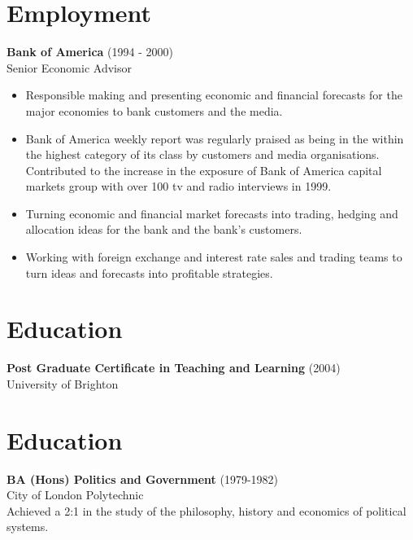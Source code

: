 \documentclass[margin,11pt]{res} %
\begin{document}
\begin{resume}
\section{Employment} 
  {\bf Bank of America} (1994 - 2000) \\
Senior Economic Advisor \\
\begin{itemize}
\item Responsible making and presenting economic and financial forecasts for the major economies to bank customers and the media. 
\item Bank of America weekly report was regularly praised as being in the within the highest category of its class by customers and media organisations. Contributed to the increase in the exposure of Bank of America capital markets group with over 100 tv and radio interviews in 1999.     
\item Turning economic and financial market forecasts into trading, hedging and allocation ideas for the bank and the bank’s customers. 
\item Working with foreign exchange and interest rate sales and trading teams to turn ideas and forecasts into profitable strategies. 
\end{itemize}

\section{Education}  
  {\bf Post Graduate Certificate in Teaching and Learning} (2004)\\
   University of Brighton\\


\section{Education}
 {\bf BA (Hons) Politics and Government} (1979-1982)\\
  City of London Polytechnic\\
Achieved a 2:1 in the study of the philosophy, history and economics of political systems.    


                 

\end{resume} 
\end{document}
